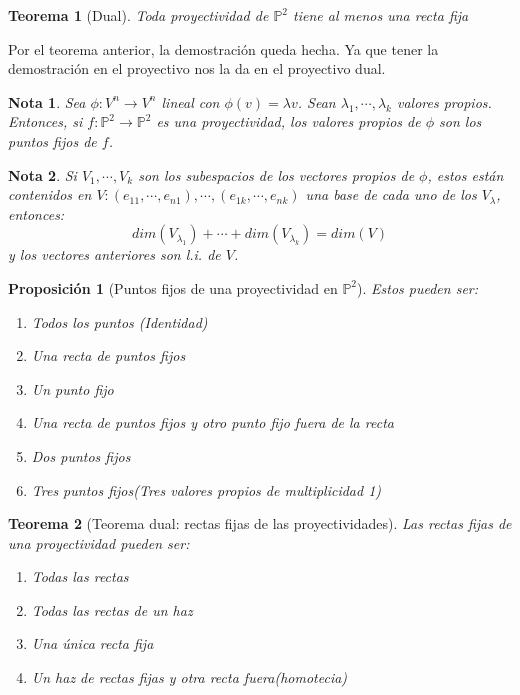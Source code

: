 \documentclass[11pt, a4paper]{article}
\makeatletter
\newif\IfInSansMode
\let\oldsf\sffamily
\renewcommand*{\sffamily}{\oldsf\mathversion{sans}\InSansModetrue}
\let\oldnorm\normalfont
\renewcommand*{\normalfont}{\oldnorm\InSansModefalse\mathversion{normal}}
\renewenvironment{proof}[1][\proofname] {\vspace{-15pt}\par\pushQED{\qed}\normalfont\topsep6\p@\@plus6\p@\relax\trivlist\item[\hskip\labelsep\it#1\@addpunct{.}]\ignorespaces}{\popQED\endtrivlist\@endpefalse}
\renewenvironment{proof}[1][\proofname] {\par\pushQED{\qed}\normalfont\topsep6\p@\@plus6\p@\relax\trivlist\item[\hskip\labelsep\itshape\sffamily#1\@addpunct{.}]\ignorespaces}{\popQED\endtrivlist\@endpefalse}
\theoremstyle{theorem-style}
\newtheorem{nth}{Teorema}[section]
\newtheorem{nprop}{Proposición}[section]
\theoremstyle{definition-style}
\theoremstyle{remark-style}
\newtheorem*{nota}{Nota}
\theoremstyle{example-style}
\newenvironment{nlist}
{\begin{enumerate}
    \renewcommand\labelenumi{(\emph{\roman{enumi})}}}
  {\end{enumerate}}
\makeatother
\begin{document}
\begin{nth}[Dual]
	Toda proyectividad de $\mathbb P^2$ tiene al menos una recta fija
\end{nth}
\begin{proof}
	Por el teorema anterior, la demostración queda hecha. Ya que tener la demostración en el proyectivo nos la da en el proyectivo dual.
\end{proof}


\begin{nota}
	Sea $\phi: V^n \to V^n $ lineal con $\phi(v) = \lambda v$. Sean $\lambda_1,\cdots,\lambda_k$ valores propios. Entonces, si $f:\mathbb P^2 \to \mathbb P^2$ es una proyectividad, los valores propios de $\phi$ son los puntos fijos de $f$.
\end{nota}

\begin{nota}
	Si $V_1,\cdots,V_k$ son los subespacios de los vectores propios de $\phi$, estos están contenidos en $V:(e_{11},\cdots,e_{n1}), \cdots, (e_{1k},\cdots,e_{nk})$ una base de cada uno de los $V_\lambda$, entonces:
	\[
	dim(V_{\lambda_1}) + \cdots + dim(V_{\lambda_k}) = dim(V)
	\]
	y los vectores anteriores son l.i. de $V$.
\end{nota}


\begin{nprop}[Puntos fijos de una proyectividad en $\mathbb P^2$]
	Estos pueden ser:
	\begin{nlist}
	\item Todos los puntos (Identidad)
	\item Una recta de puntos fijos
	\item Un punto fijo
	\item Una recta de puntos fijos y otro punto fijo fuera de la recta
	\item Dos puntos fijos
	\item Tres puntos fijos(Tres valores propios de multiplicidad 1)
	
\end{nlist}
\end{nprop}

\begin{nth}[Teorema dual: rectas fijas de las proyectividades]
	Las rectas fijas de una proyectividad pueden ser:
	\begin{nlist}
	\item Todas las rectas
	\item Todas las rectas de un haz
	\item Una única recta fija
	\item Un haz de rectas fijas y otra recta fuera(homotecia)
\end{nlist}
\end{nth}
\end{document}
